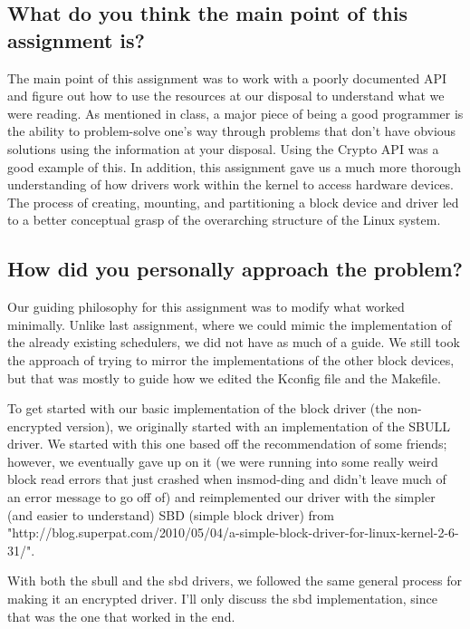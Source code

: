 \documentclass[letterpaper,10pt,titlepage]{article}
\begin{document}
\subsection{What do you think the main point of this assignment is?}
The main point of this assignment was to work with a poorly documented API and figure out how to use the resources at our disposal to understand what we were reading.
As mentioned in class, a major piece of being a good programmer is the ability to problem-solve one's way through problems that don't have obvious solutions using the information at your disposal.
Using the Crypto API was a good example of this.
In addition, this assignment gave us a much more thorough understanding of how drivers work within the kernel to access hardware devices.
The process of creating, mounting, and partitioning a block device and driver led to a better conceptual grasp of the overarching structure of the Linux system.

\subsection{How did you personally approach the problem?}
Our guiding philosophy for this assignment was to modify what worked minimally. 
Unlike last assignment, where we could mimic the implementation of the already existing schedulers, we did not have as much of a guide. 
We still took the approach of trying to mirror the implementations of the other block devices, but that was mostly to guide how we edited the Kconfig file and the Makefile. 

To get started with our basic implementation of the block driver (the non-encrypted version), we originally started with an implementation of the SBULL driver. 
We started with this one based off the recommendation of some friends; however, we eventually gave up on it (we were running into some really weird block read errors that just crashed when insmod-ding and didn't leave much of an error message to go off of) and reimplemented our driver with the simpler (and easier to understand) SBD (simple block driver) from "http://blog.superpat.com/2010/05/04/a-simple-block-driver-for-linux-kernel-2-6-31/". 

With both the sbull and the sbd drivers, we followed the same general process for making it an encrypted driver. 
I'll only discuss the sbd implementation, since that was the one that worked in the end.
\end{document}
